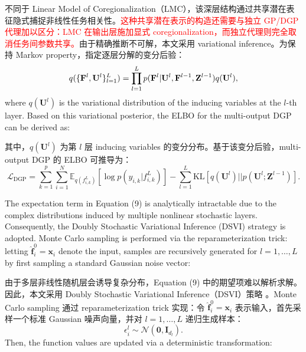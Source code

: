 \documentclass[11pt]{article}
\begin{document}
不同于 Linear Model of Coregionalization（LMC），该深层结构通过共享潜在表征隐式捕捉非线性任务相关性。\textcolor{red}{这种共享潜在表示的构造还需要与独立 GP/DGP 代理加以区分：LMC 在输出层施加显式 coregionalization，而独立代理则完全取消任务间参数共享。}由于精确推断不可解，本文采用 variational inference。为保持 Markov property，指定逐层分解的变分后验：
\begin{equation}
	q(\{ {{\bf{F}}^l},{{\bf{U}}^l}\} _{l = 1}^L) = \prod\limits_{l = 1}^L p ({{\bf{F}}^l}|{{\bf{U}}^l},{{\bf{F}}^{l - 1}},{{\bf{Z}}^{l - 1}})q({{\bf{U}}^l}){\rm{ }},
\end{equation}
where $q(\mathbf{U}^l)$ is the variational distribution of the inducing variables at the $l$-th layer. Based on this variational posterior, the ELBO for the multi-output DGP can be derived as:

其中，$q(\mathbf{U}^l)$ 为第 $l$ 层 inducing variables 的变分分布。基于该变分后验，multi-output DGP 的 ELBO 可推导为：
\begin{equation}
	{{\mathcal{L}}_{\text{DGP}}}=\sum\limits_{k=1}^{p}{\sum\limits_{i=1}^{N}{{{\mathbb{E}}_{q(f_{i,k}^{L})}}}}[\log p({{y}_{i,k}}|f_{i,k}^{L})]-\sum\limits_{l=1}^{L}{\text{KL}}[q({{\mathbf{U}}^{l}})||p({{\mathbf{U}}^{l}};{{\mathbf{Z}}^{l-1}})].
\end{equation}

The expectation term in Equation (9) is analytically intractable due to the complex distributions induced by multiple nonlinear stochastic layers. Consequently, the Doubly Stochastic Variational Inference (DSVI) strategy \cite{Salimbeni2017} is adopted. Monte Carlo sampling is performed via the reparameterization trick: letting $\hat{\mathbf{f}}_i^0 = \mathbf{x}_i$ denote the input, samples are recursively generated for $l=1, \dots, L$ by first sampling a standard Gaussian noise vector:

由于多层非线性随机层会诱导复杂分布，Equation (9) 中的期望项难以解析求解。因此，本文采用 Doubly Stochastic Variational Inference（DSVI）策略 \cite{Salimbeni2017}。Monte Carlo sampling 通过 reparameterization trick 实现：令 $\hat{\mathbf{f}}_i^0 = \mathbf{x}_i$ 表示输入，首先采样一个标准 Gaussian 噪声向量，并对 $l=1, \dots, L$ 递归生成样本：
\begin{equation}
	\epsilon _{i}^{l}\sim\mathcal{N}(\mathbf{0},{{\mathbf{I}}_{{{d}_{l}}}}).
\end{equation}
Then, the function values are updated via a deterministic transformation:
\end{document}

